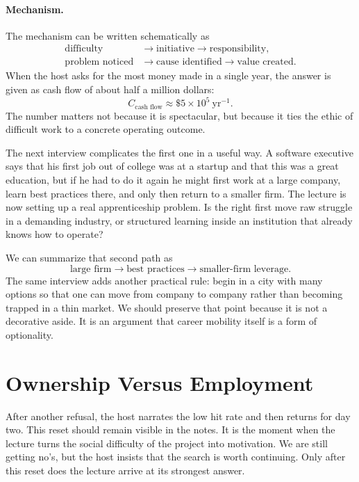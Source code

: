 \paragraph{Mechanism.}
The mechanism can be written schematically as
\begin{align}
\text{difficulty} &\longrightarrow \text{initiative} \longrightarrow \text{responsibility}, \\
\text{problem noticed} &\longrightarrow \text{cause identified} \longrightarrow \text{value created}.
\end{align}
When the host asks for the most money made in a single year, the answer is given as cash flow of about half a million dollars:
\begin{equation}
C_{\text{cash flow}} \approx \$5\times 10^{5}\ \text{yr}^{-1}.
\end{equation}
The number matters not because it is spectacular, but because it ties the ethic of difficult work to a concrete operating outcome.

The next interview complicates the first one in a useful way. A software executive says that his first job out of college was at a startup and that this was a great education, but if he had to do it again he might first work at a large company, learn best practices there, and only then return to a smaller firm. The lecture is now setting up a real apprenticeship problem. Is the right first move raw struggle in a demanding industry, or structured learning inside an institution that already knows how to operate?

We can summarize that second path as
\begin{equation}
\text{large firm} \longrightarrow \text{best practices} \longrightarrow \text{smaller-firm leverage}.
\end{equation}
The same interview adds another practical rule: begin in a city with many options so that one can move from company to company rather than becoming trapped in a thin market. We should preserve that point because it is not a decorative aside. It is an argument that career mobility itself is a form of optionality.

\section{Ownership Versus Employment}

After another refusal, the host narrates the low hit rate and then returns for day two. This reset should remain visible in the notes. It is the moment when the lecture turns the social difficulty of the project into motivation. We are still getting no's, but the host insists that the search is worth continuing. Only after this reset does the lecture arrive at its strongest answer.

